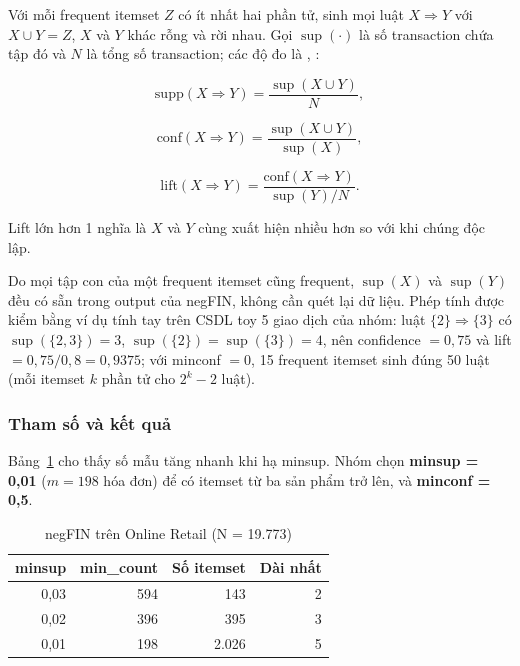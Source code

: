 Với mỗi frequent itemset \(Z\) có ít nhất hai phần tử, sinh mọi luật \(X \Rightarrow Y\) với \(X \cup Y = Z\), \(X\) và \(Y\) khác rỗng và rời nhau. Gọi \(\sup(\cdot)\) là số transaction chứa tập đó và \(N\) là tổng số transaction; các độ đo là \cite{agrawal}, \cite{brin}:

\begin{equation}
\mathrm{supp}(X \Rightarrow Y) = \frac{\sup(X \cup Y)}{N},
\end{equation}

\begin{equation}
\mathrm{conf}(X \Rightarrow Y) = \frac{\sup(X \cup Y)}{\sup(X)},
\end{equation}

\begin{equation}
\mathrm{lift}(X \Rightarrow Y) = \frac{\mathrm{conf}(X \Rightarrow Y)}{\sup(Y)/N}.
\end{equation}

Lift lớn hơn 1 nghĩa là \(X\) và \(Y\) cùng xuất hiện nhiều hơn so với khi chúng độc lập.

Do mọi tập con của một frequent itemset cũng frequent, \(\sup(X)\) và \(\sup(Y)\) đều có sẵn trong output của negFIN, không cần quét lại dữ liệu. Phép tính được kiểm bằng ví dụ tính tay trên CSDL toy 5 giao dịch của nhóm: luật \(\{2\} \Rightarrow \{3\}\) có \(\sup(\{2,3\}) = 3\), \(\sup(\{2\}) = \sup(\{3\}) = 4\), nên confidence \(= 0{,}75\) và lift \(= 0{,}75/0{,}8 = 0{,}9375\); với minconf \(= 0\), 15 frequent itemset sinh đúng 50 luật (mỗi itemset \(k\) phần tử cho \(2^k - 2\) luật).

\subsubsection{Tham số và kết quả}

Bảng~\ref{tab:c3-II} cho thấy số mẫu tăng nhanh khi hạ minsup. Nhóm chọn \textbf{minsup = 0,01} (\(m = 198\) hóa đơn) để có itemset từ ba sản phẩm trở lên, và \textbf{minconf = 0,5}.

\begin{table}[!t]
\centering\footnotesize
\caption{negFIN trên Online Retail (N = 19.773)}
\label{tab:c3-II}
\setlength{\tabcolsep}{3pt}
\begin{tabular}{rrrr}
\hline
\textbf{minsup} & \textbf{min\_count} & \textbf{Số itemset} & \textbf{Dài nhất} \\ \hline
0,03 & 594 & 143 & 2 \\
0,02 & 396 & 395 & 3 \\
0,01 & 198 & 2.026 & 5 \\
\hline
\end{tabular}
\end{table}


